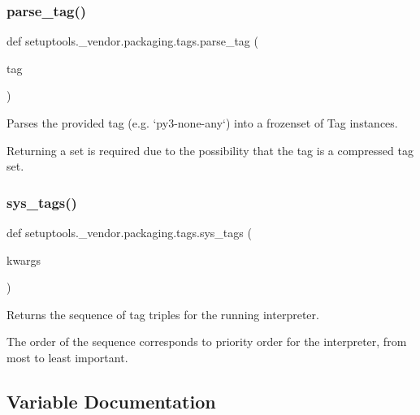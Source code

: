 \subsubsection{\texorpdfstring{parse\+\_\+tag()}{parse\_tag()}}
{\footnotesize\ttfamily def setuptools.\+\_\+vendor.\+packaging.\+tags.\+parse\+\_\+tag (\begin{DoxyParamCaption}\item[{}]{tag }\end{DoxyParamCaption})}

\begin{DoxyVerb}Parses the provided tag (e.g. `py3-none-any`) into a frozenset of Tag instances.

Returning a set is required due to the possibility that the tag is a
compressed tag set.
\end{DoxyVerb}
 \mbox{\label{namespacesetuptools_1_1__vendor_1_1packaging_1_1tags_a8d3007b31844a97ebb1009bd78674f13}} 
\subsubsection{\texorpdfstring{sys\+\_\+tags()}{sys\_tags()}}
{\footnotesize\ttfamily def setuptools.\+\_\+vendor.\+packaging.\+tags.\+sys\+\_\+tags (\begin{DoxyParamCaption}\item[{}]{kwargs }\end{DoxyParamCaption})}

\begin{DoxyVerb}Returns the sequence of tag triples for the running interpreter.

The order of the sequence corresponds to priority order for the
interpreter, from most to least important.
\end{DoxyVerb}
 

\subsection{Variable Documentation}
\mbox{\label{namespacesetuptools_1_1__vendor_1_1packaging_1_1tags_a9213cd3d53cd9e61cd14a55c18415084}} 
